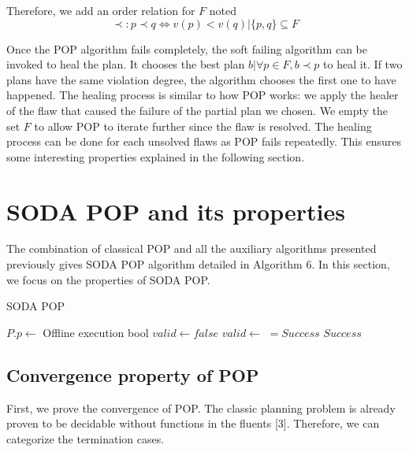 \documentclass[]{article}
\begin{document}
Therefore, we add an order relation for \(F\) noted
\[\prec : p \prec q \iff v(p) < v(q) | \{p, q\} \subseteq F\]

Once the POP algorithm fails completely, the soft failing algorithm can
be invoked to heal the plan. It chooses the best plan
\(b | \forall p \in F, b \prec p\) to heal it. If two plans have the
same violation degree, the algorithm chooses the first one to have
happened. The healing process is similar to how POP works: we apply the
healer of the flaw that caused the failure of the partial plan we
chosen. We empty the set \(F\) to allow POP to iterate further since the
flaw is resolved. The healing process can be done for each unsolved
flaws as POP fails repeatedly. This ensures some interesting properties
explained in the following section.

\hypertarget{soda}{\section{SODA POP and its properties}\label{soda}}

The combination of classical POP and all the auxiliary algorithms
presented previously gives SODA POP algorithm detailed in Algorithm 6.
In this section, we focus on the properties of SODA POP.

\begin{algorithm}\caption{SODA POP}\label{soda}\begin{algorithmic}[1]

\footnotesize
{} \State \(P.p \gets\)
 \Comment Offline execution
\State {} \State bool \(valid \gets false\)
 \State \(valid \gets\) 
\(= Success\)  \State {}
\State \Return \(Success\) \EndIf
        \State {} \EndWhile
\EndFunction

\end{algorithmic}\end{algorithm}

\subsection{Convergence property of POP}\label{convergence}

First, we prove the convergence of POP. The classic planning problem is
already proven to be decidable without functions in the fluents {[}3{]}.
Therefore, we can categorize the termination cases.
\end{document}
